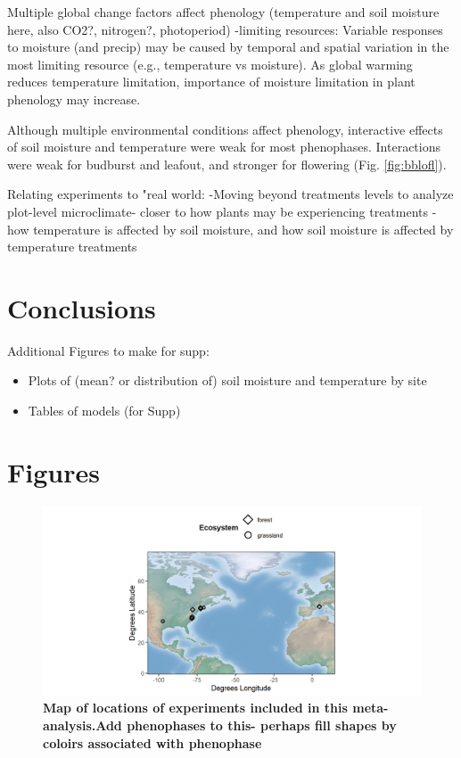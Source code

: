 \documentclass{article}
\begin{document}
\par Multiple global change factors affect phenology (temperature and soil moisture here, also CO2?, nitrogen?, photoperiod)
 -limiting resources: Variable responses to moisture (and precip) may be caused by temporal and spatial variation in the most limiting resource (e.g., temperature vs moisture). As global warming reduces temperature limitation, importance of moisture limitation in plant phenology may increase. 

\par Although multiple environmental conditions affect phenology,  interactive effects of soil moisture and temperature were weak for most phenophases. Interactions were weak for budburst and leafout, and stronger for flowering (Fig. \ref{fig:bblofl}).

\par Relating experiments to "real world:
    -Moving beyond treatments levels to analyze plot-level microclimate- closer to how plants may be experiencing treatments
    -how temperature is affected by soil moisture, and how soil moisture is affected by temperature treatments


\section* {Conclusions}

\par Additional Figures to make for supp:
 \begin{itemize}
 \item Plots of (mean? or distribution of) soil moisture and temperature by site
\item Tables of models (for Supp)
\end{itemize}



\section*{Figures}

\begin{figure}[h]
\centering
 \includegraphics{../../Analyses/maps/soilms_experiments_map.png}
 \caption{\textbf{Map of locations of experiments included in this meta-analysis.Add phenophases to this- perhaps fill shapes by coloirs associated with phenophase}} 
 \label{fig:map}
 \end{figure}
 
\end{document}
